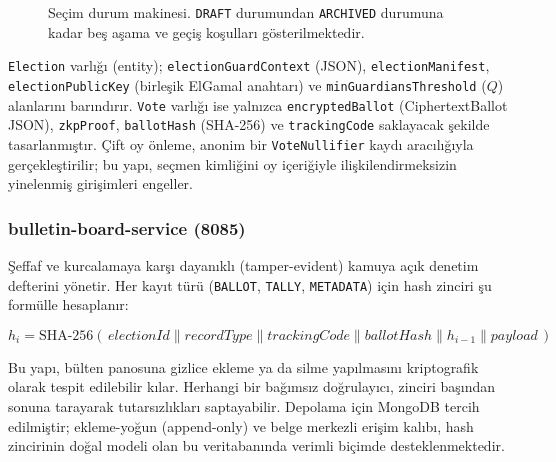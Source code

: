 \documentclass[a4paper,fleqn]{cas-sc}
\begin{document}
\begin{figure}[ht]
  \centering
  \fbox{\rule{0pt}{4cm}\rule{0.7\linewidth}{0pt}}
  \caption{Seçim durum makinesi. \texttt{DRAFT} durumundan
           \texttt{ARCHIVED} durumuna kadar beş aşama ve geçiş
           koşulları gösterilmektedir.}
  \label{fig:state_machine}
\end{figure}

\texttt{Election} varlığı (entity); \texttt{electionGuardContext} (JSON),
\texttt{electionManifest}, \texttt{electionPublicKey} (birleşik
ElGamal anahtarı) ve \texttt{minGuardiansThreshold} ($Q$) alanlarını
barındırır.
\texttt{Vote} varlığı ise yalnızca \texttt{encryptedBallot}
(CiphertextBallot JSON), \texttt{zkpProof}, \texttt{ballotHash}
(SHA-256) ve \texttt{trackingCode} saklayacak şekilde tasarlanmıştır.
Çift oy önleme, anonim bir \texttt{VoteNullifier} kaydı
aracılığıyla gerçekleştirilir; bu yapı, seçmen kimliğini oy içeriğiyle
ilişkilendirmeksizin yinelenmiş girişimleri engeller.

\subsubsection{bulletin-board-service (8085)}

Şeffaf ve kurcalamaya karşı dayanıklı (tamper-evident) kamuya açık
denetim defterini yönetir.
Her kayıt türü (\texttt{BALLOT}, \texttt{TALLY}, \texttt{METADATA})
için hash zinciri şu formülle hesaplanır:

\begin{equation}
  h_i = \text{SHA-256}(\,\mathit{electionId}
        \mathbin{\|} \mathit{recordType}
        \mathbin{\|} \mathit{trackingCode}
        \mathbin{\|} \mathit{ballotHash}
        \mathbin{\|} h_{i-1}
        \mathbin{\|} \mathit{payload}\,)
  \label{eq:hashchain}
\end{equation}

Bu yapı, bülten panosuna gizlice ekleme ya da silme yapılmasını
kriptografik olarak tespit edilebilir kılar.
Herhangi bir bağımsız doğrulayıcı, zinciri başından sonuna tarayarak
tutarsızlıkları saptayabilir.
Depolama için MongoDB tercih edilmiştir; ekleme-yoğun (append-only) ve
belge merkezli erişim kalıbı, hash zincirinin doğal modeli olan bu
veritabanında verimli biçimde desteklenmektedir.
\end{document}
